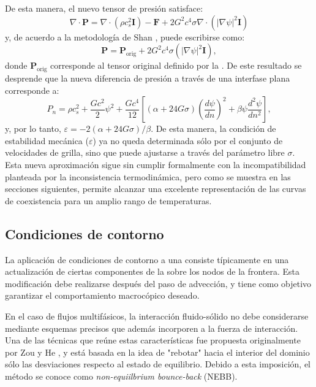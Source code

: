 De esta manera, el nuevo tensor de presi\'on satisface:
\begin{equation}
	\nabla \cdot \bm{P} = \nabla \cdot (\rho c_s^2 \bm{I}) - \bm{F} + 2G^2 c^4 \sigma \nabla \cdot (|\nabla \psi|^2 \bm{I})
\end{equation}
y, de acuerdo a la metodolog\'ia de Shan \cite{shan_pressure_2008}, puede escribirse como:
\begin{equation}
	\bm{P} = \bm{P}_{\mbox{orig}} + 2G^2 c^4 \sigma (|\nabla \psi|^2 \bm{I}),
\end{equation}
donde $\bm{P}_{\mbox{orig}}$ corresponde al tensor original definido por la . De este resultado se desprende que la nueva diferencia de presi\'on a trav\'es de una interfase plana corresponde a:
\begin{equation}
	P_n = \rho c_s^2 + \dfrac{G c^2}{2} \psi^2 + \dfrac{G c^4}{12} \left[ (\alpha+24G\sigma) \left( \dfrac{d\psi}{dn} \right)^2 + \beta \psi \dfrac{d^2 \psi}{dn^2} \right],
\end{equation}
y, por lo tanto, $\varepsilon=-2(\alpha + 24 G \sigma)/\beta$. De esta manera, la condici\'on de estabilidad mec\'anica ($\varepsilon$) ya no queda determinada s\'olo por el conjunto de velocidades de grilla, sino que puede ajustarse a trav\'es del par\'ametro libre $\sigma$. Esta nueva aproximaci\'on sigue sin cumplir formalmente con la incompatibilidad planteada por la inconsistencia termodin\'amica, pero como se muestra en las secciones siguientes, permite alcanzar una excelente representaci\'on de las curvas de coexistencia para un amplio rango de temperaturas.




\subsection{Condiciones de contorno}

La aplicaci\'on de condiciones de contorno a una \lbe{} consiste t\'ipicamente en una actualizaci\'on de ciertas componentes de la \fdp{} sobre los nodos de la frontera. Esta modificaci\'on debe realizarse despu\'es del paso de advecci\'on, y tiene como objetivo garantizar el comportamiento macroc\'opico deseado.

En el caso de flujos multif\'asicos, la interacci\'on fluido-s\'olido no debe considerarse mediante esquemas precisos que  adem\'as incorporen a la fuerza de interacci\'on. Una de las t\'ecnicas que re\'une estas caracter\'isticas fue propuesta originalmente por Zou y He \cite{zou_pressure_1997}, y est\'a basada en la idea de "rebotar" hacia el interior del dominio s\'olo las desviaciones respecto al estado de equilibrio. Debido a esta imposici\'on, el m\'etodo se conoce como \emph{non-equiilbrium bounce-back} (NEBB).

